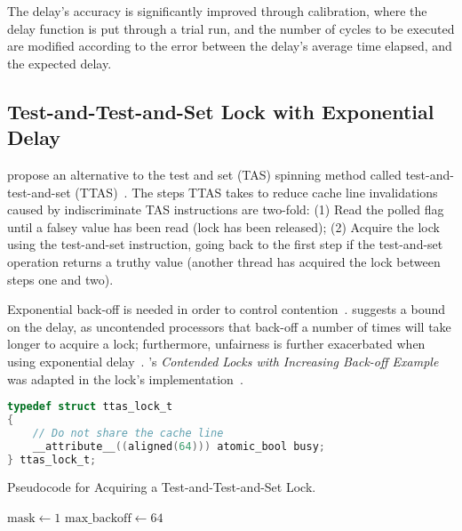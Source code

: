 The delay's accuracy is significantly improved through calibration, where the
delay function is put through a trial run, and the number of cycles to be
executed are modified according to the error between the delay's average time
elapsed, and the expected delay.

\subsection{Test-and-Test-and-Set Lock with Exponential Delay}
\citeauthor{rudolph1984dynamic} propose an alternative to the test and set
(TAS) spinning method called test-and-test-and-set
(TTAS)~\citep{rudolph1984dynamic}. The steps TTAS takes to reduce cache line
invalidations caused by indiscriminate TAS instructions are two-fold: (1) Read
the polled flag until a falsey value has been read (lock has been released);
(2) Acquire the lock using the test-and-set instruction, going back to the
first step if the test-and-set operation returns a truthy value (another thread
has acquired the lock between steps one and two). 

Exponential back-off is needed in order to control
contention~\citep{valois1994queues}. \citeauthor{anderson1990performance}
suggests a bound on the delay, as uncontended processors that back-off a number
of times will take longer to acquire a lock; furthermore, unfairness is further
exacerbated when using exponential delay~\citep[Section~7.4]{herlihy2020art}.
\citeauthor{intelmanualoptimization}'s \emph{Contended Locks with Increasing
Back-off Example} was adapted in the lock's implementation~\citep{intelmanualoptimization}.

\begin{lstlisting}[language=C,caption={Test-and-Test-and-Set Lock Struct.}]
typedef struct ttas_lock_t
{
    // Do not share the cache line
    __attribute__((aligned(64))) atomic_bool busy;
} ttas_lock_t;

\end{lstlisting}

\begin{algorithm}
    \caption{Pseudocode for Acquiring a Test-and-Test-and-Set Lock.}\label{alg:ttas_acquire}
        $\text{mask} \gets 1$
        $\text{max\_backoff} \gets 64$
            {
            
        }
\end{algorithm}

